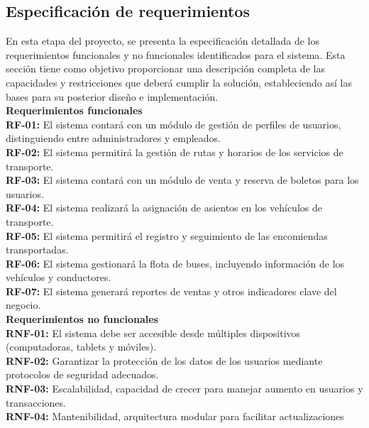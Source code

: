 	\endgroup 
	\vspace{-6pt}  %
		
	\subsection{Especificación de requerimientos}
	En esta etapa del proyecto, se presenta la especificación detallada de los requerimientos funcionales y no funcionales identificados para el sistema. Esta sección tiene como objetivo proporcionar una descripción completa de las capacidades y restricciones que deberá cumplir la solución, estableciendo así las bases para su posterior diseño e implementación.\\
	\textbf{Requerimientos funcionales} \\		
	\textbf{RF-01:} El sistema contará con un módulo de gestión de perfiles de usuarios, distinguiendo entre administradores y empleados. \\	
	\textbf{RF-02:} El sistema permitirá la gestión de rutas y horarios de los servicios de transporte. \\	
	\textbf{RF-03:} El sistema contará con un módulo de venta y reserva de boletos para los usuarios. \\	
	\textbf{RF-04:} El sistema realizará la asignación de asientos en los vehículos de transporte. \\	
	\textbf{RF-05:} El sistema permitirá el registro y seguimiento de las encomiendas transportadas. \\	
	\textbf{RF-06:} El sistema gestionará la flota de buses, incluyendo información de los vehículos y conductores. \\	
	\textbf{RF-07:} El sistema generará reportes de ventas y otros indicadores clave del negocio.\\
	\textbf{Requerimientos no funcionales} \\	
	\textbf{RNF-01:} El sistema debe ser accesible desde múltiples dispositivos (computadoras, tablets y móviles). \\	
	\textbf{RNF-02:} Garantizar la protección de los datos de los usuarios mediante protocolos de seguridad adecuados. \\	
	\textbf{RNF-03:} Escalabilidad, capacidad de crecer para manejar aumento en usuarios y transacciones. \\	
	\textbf{RNF-04:} Mantenibilidad, arquitectura modular para facilitar actualizaciones
		
